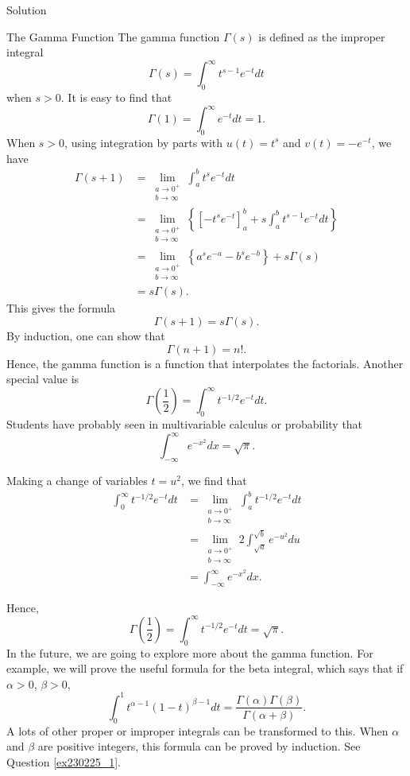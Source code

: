 \begin{example}[label=20230527]{}
\begin{solution}{Solution}
\end{solution}
\begin{highlight}{The Gamma Function}
The gamma function $\Gamma(s)$ is defined as the improper integral
\[\Gamma(s)=\int_0^{\infty}t^{s-1}e^{-t}dt\]when $s>0$. It is easy to find that
\[\Gamma(1)=\int_0^{\infty}e^{-t}dt=1.\]
When $s>0$, using integration by parts with $u(t)=t^s$ and $v(t)=-e^{-t}$, we have
\begin{align*}
\Gamma(s+1)&=\lim_{\substack{a\to 0^+\\b\to\infty}}\int_a^bt^se^{-t}dt\\
&=\lim_{\substack{a\to 0^+\\b\to\infty}}\left\{ \left[-t^se^{-t}\right]_a^b +s\int_a^b t^{s-1}e^{-t}dt\right\}\\
&=\lim_{\substack{a\to 0^+\\b\to\infty}}\left\{a^se^{-a}- b^s e^{-b} \right\}+s\Gamma(s)\\
&=s\Gamma(s).
\end{align*}
This gives the formula
\[\Gamma(s+1)=s\Gamma(s).\]
By induction, one can show that
\[\Gamma(n+1)=n!.\]
Hence, the gamma function is a function that interpolates the factorials. Another special value is
\[\Gamma\left(\frac{1}{2}\right)=\int_0^{\infty}t^{-1/2}e^{-t}dt.\]
Students have probably seen in multivariable calculus or probability that 
\[\int_{-\infty}^{\infty}e^{-x^2}dx=\sqrt{\pi}.\]\end{highlight}
\begin{highlight}{}Making a change of variables $t=u^2$, we find that
\begin{align*}
\int_0^{\infty}t^{-1/2}e^{-t}dt&=\lim_{\substack{a\to 0^+\\b\to\infty}}\int_a^b t^{-1/2}e^{-t}dt\\
&=\lim_{\substack{a\to 0^+\\b\to\infty}}2\int_{\sqrt{a}}^{\sqrt{b}}e^{-u^2}du\\
&=\int_{-\infty}^{\infty}e^{-x^2}dx.
\end{align*}


Hence,
\[\Gamma\left(\frac{1}{2}\right)=\int_0^{\infty}t^{-1/2}e^{-t}dt=\sqrt{\pi}.\]
In the future, we are going to explore more about the gamma function. For example, we will prove the useful formula for the beta integral, 
which says that if $\alpha>0$, $\beta>0$,
\[\int_0^1t^{\alpha-1}(1-t)^{\beta-1}dt=\frac{\Gamma(\alpha)\Gamma(\beta)}{\Gamma(\alpha+\beta)}.\] A lots of other proper or improper integrals can be transformed to this. When $\alpha$ and $\beta$ are positive integers, this formula can be proved by induction. See Question \ref{ex230225_1}.


\end{highlight}
\end{example}
